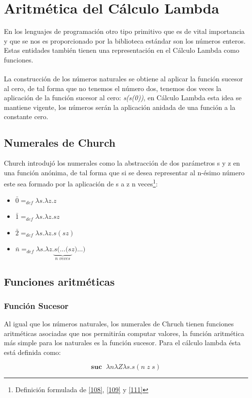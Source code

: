      \section{Aritmética del Cálculo Lambda}
        En los lenguajes de programación otro tipo primitivo que es de vital importancia y que se nos es proporcionado por la biblioteca estándar son los números enteros.
        Estas entidades también tienen una representación en el Cálculo Lambda como funciones.\\\\
        La construcción de los números naturales se obtiene al aplicar la función sucesor al cero, de tal forma que no tenemos el número dos, tenemos dos veces la aplicación de la función sucesor al cero: \textit{s(s(0))}, en Cálculo Lambda esta idea se mantiene vigente, los números serán la aplicación anidada de una función a la constante cero. 
     \subsection{Numerales de Church}
        Church introdujó los numerales como la abstracción de dos parámetros s y z en una función anónima, de tal forma que si se desea representar al n-ésimo número este sea formado por la aplicación de s a z n veces\footnote{Definición formulada de \hyperlink{108}{[108]},  \hyperlink{109}{[109]} y  \hyperlink{111}{[111]}}:

    \begin{itemize}
        \item $\bar{0}=_{def}\lambda s.\lambda z.z$
        \item $\bar{1}=_{def}\lambda s.\lambda z.sz$
        \item $\bar{2}=_{def}\lambda s.\lambda z.s(sz)$
        \item $\bar{n}=_{def}\lambda s.\lambda z.\underbrace{s(\ldots(s}_{n\;veces} z)\ldots)$
    \end{itemize}

    \subsection{Funciones aritméticas}

    \subsubsection{Función Sucesor}
        Al igual que los números naturales, los numerales de Chruch tienen funciones aritméticas asociadas que nos permitirán computar valores, la función aritmética más simple para los naturales es la función sucesor. Para el cálculo lambda ésta está definida como:
        \begin{definition}
            $$\textbf{suc } \; \lambda n\lambda Z\lambda s. s(n \; z \; s)$$
        \end{definition}
    
